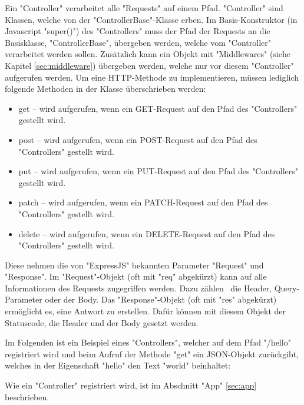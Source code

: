 \label{sec:controller}

Ein "Controller" verarbeitet alle "Requests" auf einem Pfad. 
"Controller" sind Klassen, welche von der "ControllerBase"-Klasse erben. 
Im Basis-Konstruktor (in Javascript "{\ttfamily super()}") des "Controllers" muss der Pfad der Requests an die Basisklasse, "ControllerBase", übergeben werden, welche vom "Controller" verarbeitet werden sollen. 
Zusätzlich kann ein Objekt mit "Middlewares" (siehe Kapitel \ref{sec:middleware}) übergeben werden, welche nur vor diesem "Controller" aufgerufen werden. 
Um eine HTTP-Methode zu implementieren, müssen lediglich folgende Methoden in der Klasse überschrieben werden:

\begin{itemize}
    \item {\ttfamily get} -- wird aufgerufen, wenn ein GET-Request auf den Pfad des "Controllers" gestellt wird.
    \item {\ttfamily post} -- wird aufgerufen, wenn ein POST-Request auf den Pfad des "Controllers" gestellt wird.
    \item {\ttfamily put} -- wird aufgerufen, wenn ein PUT-Request auf den Pfad des "Controllers" gestellt wird.
    \item {\ttfamily patch} -- wird aufgerufen, wenn ein PATCH-Request auf den Pfad des "Controllers" gestellt wird.
    \item {\ttfamily delete} -- wird aufgerufen, wenn ein DELETE-Request auf den Pfad des "Controllers" gestellt wird.
\end{itemize}

Diese nehmen die von "ExpressJS" bekannten Parameter "Request" und "Response". 
Im "Request"-Objekt (oft mit "req" abgekürzt) kann auf alle Informationen des Requests zugegriffen werden. Dazu zählen \zb\ die Header, Query-Parameter oder der Body.
Das "Response"-Objekt (oft mit "res" abgekürzt) ermöglicht es, eine Antwort zu erstellen. Dafür können mit diesem Objekt der Statuscode, die Header und der Body gesetzt werden.


Im Folgenden ist ein Beispiel eines "Controllers", welcher auf dem Pfad "/hello" registriert wird und beim Aufruf der Methode "get" ein JSON-Objekt zurückgibt, welches in der Eigenschaft "hello" den Text "world" beinhaltet:


Wie ein "Controller" registriert wird, ist im Abschnitt "App" \ref{sec:app} beschrieben. 